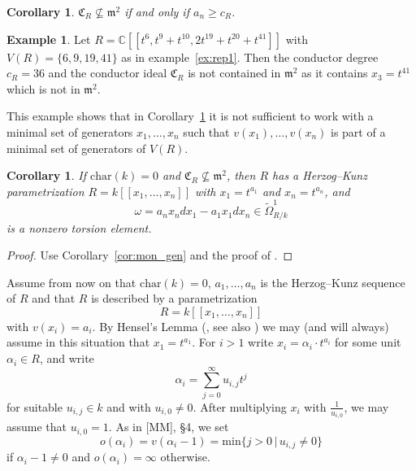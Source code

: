 \documentclass[12pt]{amsart}
\def \C{\mathbb C}
\theoremstyle{plain}%
\newtheorem{Corollary}[satz]{Corollary}
\theoremstyle{definition}
\newtheorem{beispiel}{Example}[section]
\renewcommand{\(}{\left(}
\renewcommand{\)}{\right)}
\renewcommand{\geq}{\geqslant}
\begin{document}
\begin{Corollary}\label{cor:cr_msquare} 
$\mathfrak C_R \not\subseteq \mathfrak m^2$ if and only if $a_n \geq c_R$.
\end{Corollary}

\begin{beispiel}\label{ex:cond_not_m2}
Let $R = \C[[t^{6}, t^{9}+t^{10}, 2 t^{19}+t^{20}+t^{41}]]$ 
with $V(R) = \{6,9,19,41\}$ as in example~\ref{ex:rep1}. 
Then the conductor degree $c_R = 36$ and the conductor ideal 
$\mathfrak C_R$ is not contained in $ \mathfrak m^2$ as it 
contains $x_3 = t^{41}$ which is not in $\mathfrak m^2$.  

This example shows that in Corollary~\ref{cor:cr_msquare} it 
is not sufficient to work with a minimal set of generators 
$x_1, \ldots, x_n$ such that $v(x_1), \ldots, v(x_n)$ 
is part of a minimal set of generators of $V(R)$.
\end{beispiel}

\begin{Corollary}\label{cor:cr_pure_power}
If $\mathrm{char}(k) = 0$ and $\mathfrak C_R \not\subseteq 
\mathfrak m^2$, then $R$ has a Herzog--Kunz parametrization 
$R = k[[x_1, \ldots, x_n]]$ with $x_1 = t^{a_1}$ 
and $x_n = t^{a_n}$, and 
	$$ \omega = a_n x_n dx_1 - a_1 x_1 dx_n \in 
    \widetilde{\Omega}^1_{R/k} $$
is a nonzero torsion element.  
\end{Corollary}

\begin{proof}
Use Corollary~\ref{cor:mon_gen}  and the proof of 
\cite[Theorem 3.1]{HMM}.
\end{proof}

\medbreak

Assume from now on that $\mathrm{char}(k) = 0$, $a_1, 
\ldots, a_n$ is the Herzog--Kunz sequence of $R$ and that 
$R$ is described by a parametrization 
	$$ R = k[[x_1, \ldots , x_n]] $$
with $v(x_i) = a_i$. By Hensel's Lemma (\cite[Theorem 7.3]{Ei}, 
see also \cite[Proof of Theorem 3.1]{HMM}) we may (and will 
always) assume in this situation that $x_1 = t^{a_1}$. 
For $i > 1$ write $x_i = \alpha_i \cdot t^{a_i}$ for some 
unit $\alpha_i \in R$, and write 
	$$ \alpha_i = \sum\limits_{j=0}^{\infty} u_{i,j} t^j $$
for suitable $u_{i,j} \in k$ and with $u_{i,0} \neq 0$. After 
multiplying $x_i$ with $\frac {1}{u_{i,0}}$, we may assume 
that $u_{i,0} = 1$. As in [MM], \S 4, we set 
	$$ \mathit{o}(\alpha_i) = v(\alpha_i - 1) = 
    \mathrm{min}\{j > 0 \,\vert \, u_{i,j} \neq 0 \} $$
if $\alpha_i-1 \neq 0$ and $\mathit{o}(\alpha_i) = \infty$ 
otherwise. 
\end{document}
